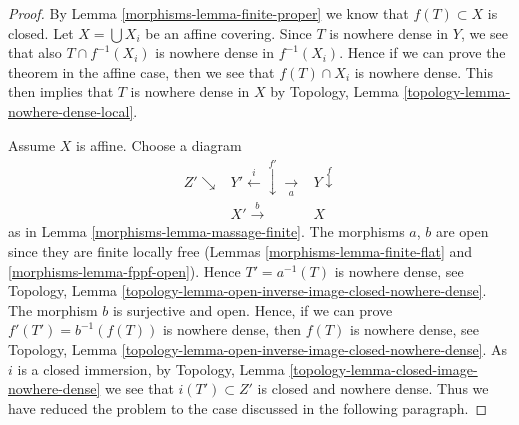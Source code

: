 \begin{proof}

By Lemma \ref{morphisms-lemma-finite-proper} we know that $f(T) \subset X$ is closed.
Let $X = \bigcup X_i$ be an affine covering.
Since $T$ is nowhere dense in $Y$, we see that also $T \cap f^{-1}(X_i)$
is nowhere dense in $f^{-1}(X_i)$. Hence if we can prove the theorem in the
affine case, then we see that $f(T) \cap X_i$ is nowhere dense.
This then implies that $T$ is nowhere dense in $X$ by
Topology, Lemma \ref{topology-lemma-nowhere-dense-local}.

\medskip\noindent
Assume $X$ is affine. Choose a diagram
$$
\begin{array}{ccc}Z' \searrow & Y' \overset{i}{\longleftarrow}\overset{f'}{\downarrow}\underset{a}{\longrightarrow} & Y \overset{f}{\downarrow} \\  & X' \overset{b}{\longrightarrow} & X\end{array}
$$
as in Lemma \ref{morphisms-lemma-massage-finite}. The morphisms $a$, $b$ are
open since they are finite locally free
(Lemmas \ref{morphisms-lemma-finite-flat} and \ref{morphisms-lemma-fppf-open}).
Hence $T' = a^{-1}(T)$ is nowhere dense, see
Topology, Lemma \ref{topology-lemma-open-inverse-image-closed-nowhere-dense}.
The morphism $b$ is surjective and open.
Hence, if we can prove $f'(T') = b^{-1}(f(T))$ is
nowhere dense, then $f(T)$ is nowhere dense, see
Topology, Lemma \ref{topology-lemma-open-inverse-image-closed-nowhere-dense}.
As $i$ is a closed immersion, by
Topology, Lemma \ref{topology-lemma-closed-image-nowhere-dense}
we see that $i(T') \subset Z'$ is closed and nowhere dense.
Thus we have reduced the problem to the case discussed
in the following paragraph.


\end{proof}
